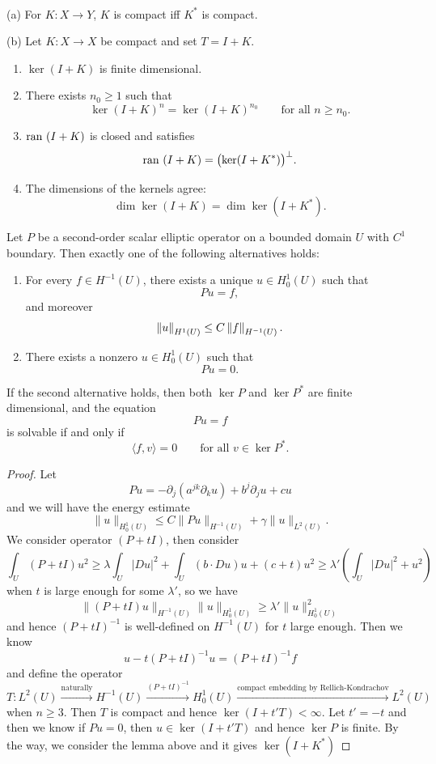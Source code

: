 \begin{lemma}\ \par
(a) For $K:X\to Y$, $K$ is compact iff $K^*$ is compact.\par
(b) Let $K:X\to X$ be compact and set $T=I+K$.
\begin{enumerate}
    \item $\ker(I+K)$ is finite dimensional.
    \item There exists $n_0\geq 1$ such that
    \[
    \ker(I+K)^n = \ker(I+K)^{n_0}
    \qquad \text{for all }n\geq n_0.
    \]
    \item $\text{ran}\ {(}I+K)$ is closed and satisfies
    \[
    \text{ran}\ {(}I+K) = \bigl(\ker(I+K^*)\bigr)^\perp.
    \]
    \item The dimensions of the kernels agree:
    \[
    \dim \ker(I+K)=\dim \ker(I+K^*).
    \]
\end{enumerate}
\end{lemma}
\begin{theorem}
Let $P$ be a second-order scalar elliptic operator on a bounded domain $U$ with $C^1$ boundary. Then exactly one of the following alternatives holds:
\begin{enumerate}
    \item For every $f\in H^{-1}(U)$, there exists a unique $u\in H_0^1(U)$ such that
    \[
    Pu=f,
    \]
    and moreover
    \[
    \left\lVert u \right\rVert_{H^1(U)}\leq C\left\lVert f \right\rVert_{H^{-1}(U)}.
    \]
    \item There exists a nonzero $u\in H_0^1(U)$ such that
    \[
    Pu=0.
    \]
\end{enumerate}
If the second alternative holds, then both $\ker P$ and $\ker P^*$ are finite dimensional, and the equation
\[
Pu=f
\]
is solvable if and only if
\[
\langle f,v\rangle = 0
\qquad \text{for all }v\in \ker P^*.
\]
\end{theorem}
\begin{proof}
    Let
    \[
    Pu = -\partial_j(a^{jk}\partial_k u)+b^j\partial_j u + cu
    \]
    and we will have the energy estimate
    \[
    \lVert u\rVert_{H^1_0(U)} \leq C\lVert Pu\rVert_{H^{-1}(U)} + \gamma\lVert u\rVert_{L^2(U)}.
    \]
    We consider operator $(P+tI)$, then consider
    \[
    \int_U (P+tI)u^2 \geq \lambda\int_U|Du|^2 + \int_U (b\cdot Du)u + (c+t)u^2 \geq \lambda' \left(\int_U |Du|^2 + u^2\right)
    \]
    when $t$ is large enough for some $\lambda'$, so we have
    \[
    \lVert (P+tI)u\rVert_{H^{-1}(U)}\lVert u\rVert_{H^1_0(U)} \geq \lambda'\lVert u\rVert_{H^1_0(U)}^2
    \]
    and hence $(P+tI)^{-1}$ is well-defined on $H^{-1}(U)$ for $t$ large enough. Then we know
    \[
    u - t(P+tI)^{-1}u = (P+tI)^{-1}f
    \]
    and define the operator
    \[
    T: L^2(U) \xrightarrow{\text{naturally}}H^{-1}(U) \xrightarrow{(P+tI)^{-1}} H^1_0(U) \xrightarrow{\text{compact embedding by Rellich-Kondrachov}} L^2(U)
    \]
    when $n \geq 3$. Then $T$ is compact and hence $\ker (I + t'T) < \infty$. Let $t' = -t$ and then we know if $Pu = 0$, then $u \in \ker(I+t'T)$ and hence $\ker P$ is finite. By the way, we consider the lemma above and it gives $\ker(I+K^*) $
\end{proof}

